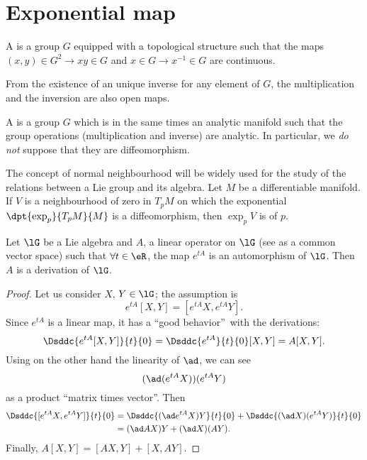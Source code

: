 \section{Exponential map}

\begin{definition}
    A  is a group $G$ equipped with a topological structure such that the maps $(x,y)\in G^2\to xy\in G$ and $x\in G\to x^{-1}\in G$ are continuous.
\end{definition}

\begin{remark}\label{rem:ouvert}
From the existence of an unique inverse for any element of $G$, the multiplication and the inversion are also open maps.
\end{remark}

\begin{definition}
    A  is a group $G$ which is in the same times an analytic manifold such that the group operations (multiplication and inverse) are analytic. In particular, we \emph{do not} suppose that they are diffeomorphism.
\end{definition}

The concept of normal neighbourhood will be widely used for the study of the relations between a Lie group and its algebra. Let $M$ be a differentiable manifold. If $V$ is a neighbourhood of zero in $T_pM$ on which the exponential $\dpt{\exp_p}{T_pM}{M}$ is a diffeomorphism, then $\exp_pV$ is   of $p$.

\begin{lemma}
Let $\lG$ be a Lie algebra and $A$, a linear operator on $\lG$ (see as a common vector space) such that $\forall t\in\eR$, the map $e^{tA}$ is an automorphism of $\lG$. Then $A$ is a derivation of $\lG$.
\label{lem:autom_derr}
\end{lemma}

\begin{proof}
Let us consider $X$, $Y\in\lG$;  the assumption is
\[
  e^{tA}[X,Y]=[e^{tA}X,e^{tA}Y].
\]
Since $e^{tA}$ is a linear map, it has a ``good behavior''\ with the derivations:
\[
\Dsddc{e^{tA}[X,Y]}{t}{0}=\Dsddc{e^{tA}}{t}{0}[X,Y]=A[X,Y].
\]
Using on the other hand the linearity of $\ad$, we can see
\[
  (\ad(e^{tA}X))(e^{tA}Y)
\]
as a product ``matrix times vector''. Then
\begin{equation}
\begin{split}
  \Dsddc{[e^{tA}X,e^{tA}Y]}{t}{0}&=\Dsddc{(\ad e^{tA}X)Y}{t}{0}+\Dsddc{(\ad X)(e^{tA}Y)}{t}{0}\\
                                 &=(\ad AX)Y+(\ad X)(AY).
\end{split}
\end{equation}
Finally, $A[X,Y]=[AX,Y]+[X,AY]$.

\end{proof}

